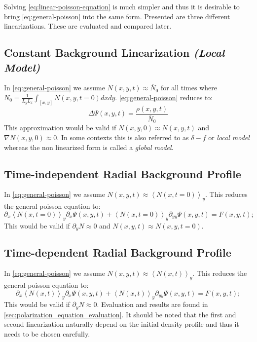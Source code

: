 \documentclass[master.tex]{subfiles}
\begin{document}
Solving \autoref{eq:linear-poisson-equation} is much simpler and thus it is desirable to bring \autoref{eq:general-poisson} into the same form. Presented are three different linearizations. These are evaluated and compared later.

\subsection{Constant Background Linearization \textit{(Local Model)}}

In \autoref{eq:general-poisson} we assume $N(x,y, t) \approx \overline{N}_0$ for all times where $\overline{N}_0=\frac{1}{L_yL_x}\int_{[x,y]} N(x,y, t = 0) dx dy$. \autoref{eq:general-poisson} reduces to:
\begin{equation}
    \Delta \Psi(x,y,t) = \frac{\rho(x,y,t)}{\overline{N}_0}
\end{equation}
This approximation would be valid if $N(x,y, 0) \approx N(x,y,t)$ and $\nabla N(x,y,0) \approx 0$. In some contexts this is also referred to as  $\delta-f$ or \textit{local model} whereas the non linearized form is called a \textit{global model}.

\subsection{Time-independent Radial Background Profile}
In \autoref{eq:general-poisson} we assume $N(x,y,t) \approx \left<N(x,t = 0)\right>_y$. This reduces the general poisson equation to:
\begin{equation}
    \partial_x \left<N(x,t = 0)\right>_y \partial_x \Psi(x,y,t) + \left<N(x,t = 0)\right>_y \partial_{yy} \Psi(x,y,t) = F(x,y,t);
\end{equation}
This would be valid if $\partial_y N \approx 0$ and $N(x,y,t) \approx N(x,y, t= 0)$.

\subsection{Time-dependent Radial Background Profile}
In \autoref{eq:general-poisson} we assume $N(x,y,t) \approx \left<N(x,t)\right>_y$. This reduces the general poisson equation to:
\begin{equation}
    \partial_x \left<N(x,t)\right>_y \partial_x \Psi(x,y,t) + \left<N(x,t)\right>_y \partial_{yy} \Psi(x,y,t) = F(x,y,t);
\end{equation}
This would be valid if $\partial_y N \approx 0$.
\newline
Evaluation and results are found in \autoref{sec:polarization_equation_evaluation}. It should be noted that the first and second linearization naturally depend on the initial density profile and thus it needs to be chosen carefully.
\end{document}
